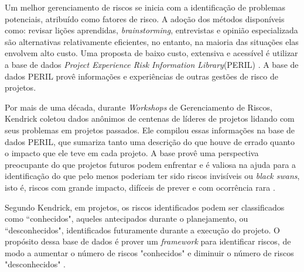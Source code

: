 Um melhor gerenciamento de riscos se inicia com a identificação de problemas potenciais, atribuído como fatores de risco. A adoção dos métodos disponíveis como: revisar lições aprendidas, \textit{brainstorming}, entrevistas e opinião especializada são alternativas relativamente eficientes, no entanto, na maioria das situações elas envolvem alto custo. Uma proposta de baixo custo, extensiva e acessível é utilizar a base de dados \textit{Project Experience Risk Information Library}(PERIL) \cite{kendrick2003identifying}. A base de dados PERIL provê informações e experiências de outras gestões de risco de projetos.

Por mais de uma década, durante \textit{Workshops} de Gerenciamento de Riscos, Kendrick coletou dados anônimos de centenas de líderes de projetos lidando com seus problemas em projetos passados. Ele compilou essas informações na base de dados PERIL, que sumariza tanto uma descrição do que houve de errado quanto o impacto que ele teve em cada projeto. A base provê uma perspectiva preocupante do que projetos futuros podem enfrentar e é valiosa na ajuda para a identificação do que pelo menos poderiam ter sido riscos invisíveis ou \textit{black swans}, isto é, riscos com grande impacto, difíceis de prever e com ocorrência rara \cite{kendrick2003identifying}.

Segundo Kendrick, em projetos, os riscos identificados podem ser classificados como ``conhecidos", aqueles antecipados durante o planejamento, ou ``desconhecidos", identificados futuramente durante a execução do projeto. O propósito dessa base de dados é prover um \textit{framework} para identificar riscos, de modo a aumentar o número de riscos "conhecidos" e diminuir o número de riscos "desconhecidos" \cite{kendrick2003identifying}.

